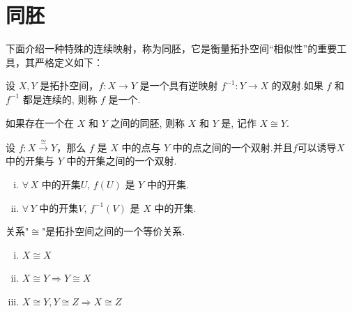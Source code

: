 \section{同胚}

下面介绍一种特殊的连续映射，称为同胚，它是衡量拓扑空间“相似性”的重要工具，其严格定义如下：

\begin{definition}[同胚][def:3.2]
    设 $X,Y$ 是拓扑空间，$f:X\to Y$ 是一个具有逆映射 $f^{-1}:Y\to X$ 的双射.如果 $f$ 和 $f^{-1}$ 都是连续的, 则称 $f$ 是一个.\par
    如果存在一个在 $X$ 和 $Y$ 之间的同胚, 则称 $X$ 和 $Y$ 是, 记作 $X\cong Y$.
\end{definition}

\begin{remark}
    设 $f:X\stackrel{\cong}{\longrightarrow} Y$，那么 $f$ 是 $X$ 中的点与 $Y$ 中的点之间的一个双射.并且$f$可以诱导$X$ 中的开集与 $Y$ 中的开集之间的一个双射.
    \begin{enumerate}[(i)]
        \item $\forall\, X$ 中的开集$U$, $f(U)$ 是 $Y$ 中的开集.\par
        [$f^{-1}:Y\to X$ 是连续的 $\Rightarrow (f^{-1})^{-1}(U)$ 在 $Y$ 中是开集, 即 $f(U)$ 在 $Y$ 中是开集]
        \item $\forall\, Y$ 中的开集$V$, $f^{-1}(V)$ 是 $X$ 中的开集.\par
        [$f:X\to Y$ 是连续的 $\Rightarrow f^{-1}(V)$ 在 $X$ 中是开集]
    \end{enumerate}
\end{remark}

\begin{proposition}[][prop:3.2]
    关系"$\cong$"是拓扑空间之间的一个等价关系.
    \begin{enumerate}[(i)]
        \item $X\cong X$
        \item $X\cong Y \Rightarrow Y\cong X$
        \item $X\cong Y, Y\cong Z \Rightarrow X\cong Z$
    \end{enumerate}
\end{proposition}

